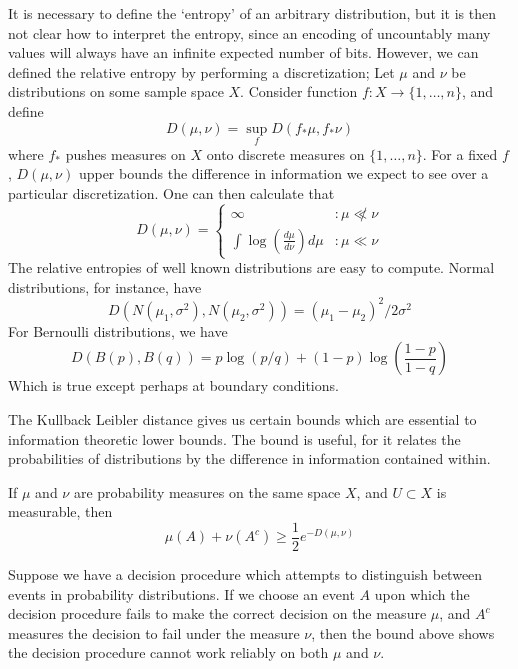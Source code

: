 It is necessary to define the `entropy' of an arbitrary distribution, but it is then not clear how to interpret the entropy, since an encoding of uncountably many values will always have an infinite expected number of bits. However, we can defined the relative entropy by performing a discretization; Let $\mu$ and $\nu$ be distributions on some sample space $X$. Consider function $f: X \to \{ 1, \dots, n \}$, and define
%
\[ D(\mu, \nu) = \sup_f D(f_* \mu, f_* \nu) \]
%
where $f_*$ pushes measures on $X$ onto discrete measures on $\{ 1, \dots, n \}$. For a fixed $f$, $D(\mu, \nu)$ upper bounds the difference in information we expect to see over a particular discretization. One can then calculate that
%
\[ D(\mu, \nu) = \begin{cases} \infty &: \mu \not \ll \nu \\ \int \log(\frac{d\mu}{d\nu}) d\mu &: \mu \ll \nu \end{cases} \]
%
The relative entropies of well known distributions are easy to compute. Normal distributions, for instance, have
%
\[ D(N(\mu_1, \sigma^2), N(\mu_2, \sigma^2)) = (\mu_1 - \mu_2)^2/2\sigma^2 \]
%
For Bernoulli distributions, we have
%
\[ D(B(p), B(q)) = p \log(p/q) + (1-p)\log \left( \frac{1-p}{1-q} \right) \]
%
Which is true except perhaps at boundary conditions.

The Kullback Leibler distance gives us certain bounds which are essential to information theoretic lower bounds. The bound is useful, for it relates the probabilities of distributions by the difference in information contained within.

\begin{theorem}
    If $\mu$ and $\nu$ are probability measures on the same space $X$, and $U \subset X$ is measurable, then
    \[ \mu(A) + \nu(A^c) \geq \frac{1}{2} e^{- D(\mu, \nu)} \]
\end{theorem}

Suppose we have a decision procedure which attempts to distinguish between events in probability distributions. If we choose an event $A$ upon which the decision procedure fails to make the correct decision on the measure $\mu$, and $A^c$ measures the decision to fail under the measure $\nu$, then the bound above shows the decision procedure cannot work reliably on both $\mu$ and $\nu$.




















